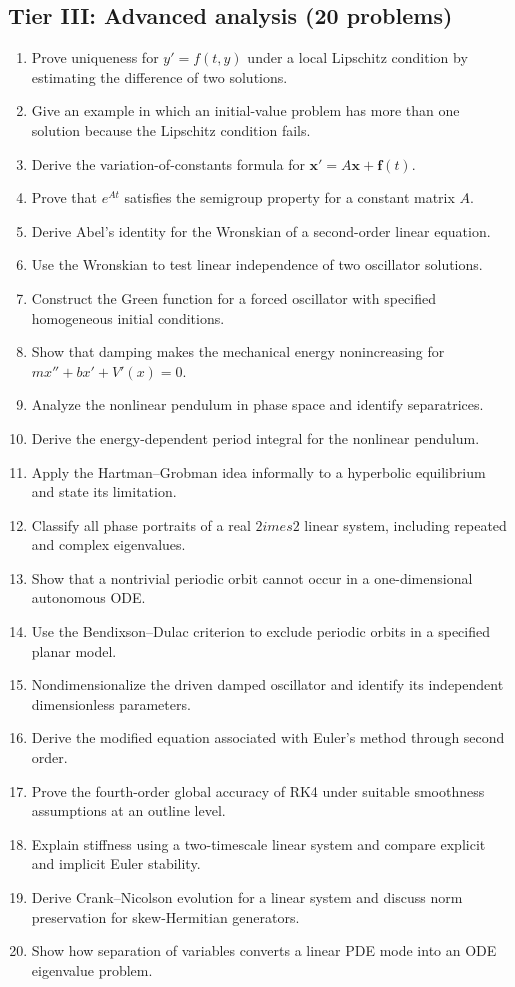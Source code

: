 \subsection*{Tier III: Advanced analysis (20 problems)}
\begin{enumerate}[label=\textbf{\arabic*.},leftmargin=*]
\item Prove uniqueness for $y'=f(t,y)$ under a local Lipschitz condition by estimating the difference of two solutions.
\item Give an example in which an initial-value problem has more than one solution because the Lipschitz condition fails.
\item Derive the variation-of-constants formula for $\mathbf x'=A\mathbf x+\mathbf f(t)$.
\item Prove that $e^{At}$ satisfies the semigroup property for a constant matrix $A$.
\item Derive Abel's identity for the Wronskian of a second-order linear equation.
\item Use the Wronskian to test linear independence of two oscillator solutions.
\item Construct the Green function for a forced oscillator with specified homogeneous initial conditions.
\item Show that damping makes the mechanical energy nonincreasing for $m x''+b x'+V'(x)=0$.
\item Analyze the nonlinear pendulum in phase space and identify separatrices.
\item Derive the energy-dependent period integral for the nonlinear pendulum.
\item Apply the Hartman--Grobman idea informally to a hyperbolic equilibrium and state its limitation.
\item Classify all phase portraits of a real $2	imes2$ linear system, including repeated and complex eigenvalues.
\item Show that a nontrivial periodic orbit cannot occur in a one-dimensional autonomous ODE.
\item Use the Bendixson--Dulac criterion to exclude periodic orbits in a specified planar model.
\item Nondimensionalize the driven damped oscillator and identify its independent dimensionless parameters.
\item Derive the modified equation associated with Euler's method through second order.
\item Prove the fourth-order global accuracy of RK4 under suitable smoothness assumptions at an outline level.
\item Explain stiffness using a two-timescale linear system and compare explicit and implicit Euler stability.
\item Derive Crank--Nicolson evolution for a linear system and discuss norm preservation for skew-Hermitian generators.
\item Show how separation of variables converts a linear PDE mode into an ODE eigenvalue problem.
\end{enumerate}

